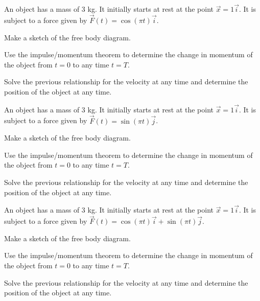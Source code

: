 \begin{problem}
\item An object has a mass of 3 kg. It initially starts at rest at the
  point $\vec{x}=1\vec{i}$. It is subject to a force given by
  $\vec{F}(t) = \cos(\pi t) \vec{i}$.
  \begin{subproblem}
    \item Make a sketch of the free body diagram.
      \vspace{5em}
    \item Use the impulse/momentum theorem to determine the change in
      momentum of the object from $t=0$ to any time $t=T$.
      \vfill
    \item Solve the previous relationship for the velocity at any time
      and determine the position of the object at any time.
      \vfill
  \end{subproblem}

  \clearpage

\item An object has a mass of 3 kg. It initially starts at rest at the
  point $\vec{x}=1\vec{i}$. It is subject to a force given by
  $\vec{F}(t) = \sin(\pi t)\vec{j}$.
  \begin{subproblem}
    \item Make a sketch of the free body diagram.
      \vspace{5em}
    \item Use the impulse/momentum theorem to determine the change in
      momentum of the object from $t=0$ to any time $t=T$.
      \vfill
    \item Solve the previous relationship for the velocity at any time
      and determine the position of the object at any time.
      \vfill
  \end{subproblem}

  \clearpage

\item An object has a mass of 3 kg. It initially starts at rest at the
  point $\vec{x}=1\vec{i}$. It is subject to a force given by
  $\vec{F}(t) = \cos(\pi t)\vec{i}+\sin(\pi t)\vec{j}$.
  \begin{subproblem}
    \item Make a sketch of the free body diagram.
      \vspace{5em}
    \item Use the impulse/momentum theorem to determine the change in
      momentum of the object from $t=0$ to any time $t=T$.
      \vfill
    \item Solve the previous relationship for the velocity at any time
      and determine the position of the object at any time.
      \vfill
  \end{subproblem}

\end{problem}


